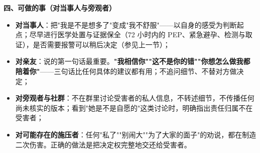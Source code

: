 \textbf{四、可做的事（对当事人与旁观者）}
\begin{itemize}
\item \textbf{对当事人}：把"我是不是想多了"变成"我不舒服"——以自身的感受为判断起点；尽早进行医学处置与证据保全（72 小时内的 PEP、紧急避孕、检测与取证），是否需要报警可以稍后决定（参见上一节）；
\item \textbf{对亲友}：说的第一句话最重要。\textbf{"我相信你""这不是你的错""你想怎么做我都陪着你"}——三句话比任何具体的建议都有用；不追问细节、不替对方做决定；
\item \textbf{对旁观者与社群}：不在群里讨论受害者的私人信息，不转述细节，不传播任何尚未核实的版本；看到"她是不是自愿的"这类讨论时，明确指出责任归属不在受害者；
\item \textbf{对可能存在的施压者}：任何"私了""别闹大""为了大家的面子"的劝说，都在制造二次伤害。正确的做法是把决定权完整地交还给受害者。
\end{itemize}

